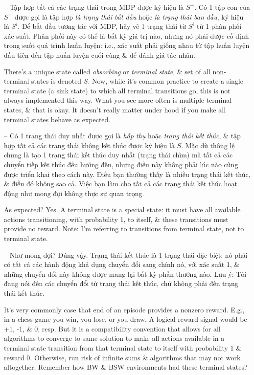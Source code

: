\documentclass{article}
\begin{document}
\begin{itemize}
\begin{itemize}
        -- Tập hợp tất cả các trạng thái trong MDP được ký hiệu là $S^+$. Có 1 tập con của $S^+$ được gọi là tập hợp {\it là trạng thái bắt đầu} hoặc {\it là trạng thái ban đầu}, ký hiệu là $S^i$. Để bắt đầu tương tác với MDP, hãy vẽ 1 trạng thái từ $S^i$ từ 1 phân phối xác suất. Phân phối này có thể là bất kỳ giá trị nào, nhưng nó phải được cố định trong suốt quá trình huấn luyện: i.e., xác suất phải giống nhau từ tập huấn luyện đầu tiên đến tập huấn luyện cuối cùng \& để đánh giá tác nhân.

        There's a unique state called {\it absorbing} or {\it terminal state}, \& set of all non-terminal states is denoted $S$. Now, while it's common practice to create a single terminal state (a sink state) to which all terminal transitions go, this is not always implemented this way. What you see more often is multiple terminal states, \& that is okay. It doesn't really matter under hood if you make all terminal states behave as expected.

        -- Có 1 trạng thái duy nhất được gọi là {\it hấp thụ} hoặc {\it trạng thái kết thúc}, \& tập hợp tất cả các trạng thái không kết thúc được ký hiệu là $S$. Mặc dù thông lệ chung là tạo 1 trạng thái kết thúc duy nhất (trạng thái chìm) mà tất cả các chuyển tiếp kết thúc đều hướng đến, nhưng điều này không phải lúc nào cũng được triển khai theo cách này. Điều bạn thường thấy là nhiều trạng thái kết thúc, \& điều đó không sao cả. Việc bạn làm cho tất cả các trạng thái kết thúc hoạt động như mong đợi không thực sự quan trọng.

        As expected? Yes. A terminal state is a special state: it must have all available actions transitioning, with probability 1, to itself, \& these transitions must provide no reward. Note: I'm referring to transitions from terminal state, not to terminal state.

        -- Như mong đợi? Đúng vậy. Trạng thái kết thúc là 1 trạng thái đặc biệt: nó phải có tất cả các hành động khả dụng chuyển đổi sang chính nó, với xác suất 1, \& những chuyển đổi này không được mang lại bất kỳ phần thưởng nào. Lưu ý: Tôi đang nói đến các chuyển đổi từ trạng thái kết thúc, chứ không phải đến trạng thái kết thúc.

        It's very commonly case that end of an episode provides a nonzero reward. E.g., in a chess game you win, you lose, or you draw. A logical reward signal would be +1, -1, \& 0, resp. But it is a compatibility convention that allows for all algorithms to converge to same solution to make all actions available in a terminal state transition from that terminal state to itself with probability 1 \& reward 0. Otherwise, run risk of infinite sums \& algorithms that may not work altogether. Remember how BW \& BSW environments had these terminal states?


\end{itemize}
\end{itemize}
\end{document}
